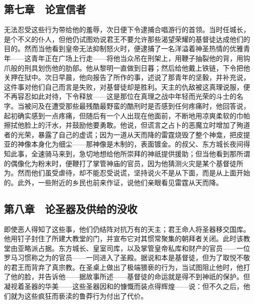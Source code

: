 
\subsection{第七章　论宣信者}

无法忍受这些行为带给他的羞辱，次日便下令逮捕合唱游行的首领。当时任城长，是个不义的仆人，但他仍试图劝说君王不要允许那些渴望荣耀的基督徒达成他们的目的。然而当他看到皇帝无法抑制怒火时，便逮捕了一名洋溢着神圣热情的优雅青年——这青年正在广场上行走——将他当众吊在刑架上，用鞭子抽裂他的背，用钩爪般的刑具划伤他的肋部。他从黎明一直做到日暮；然后给他戴上铁链，下令把他关押在狱中。次日早晨，他向报告了所作的事，述说了那青年的坚毅，并补充说，这件事对他们自己而言是失败，对基督徒却是胜利。天主的仇敌被这真理说服，便不再容忍如此对待，下令释放——这是那位在真理之战中年轻而光荣的斗士的名字。当被问及在遭受那些最残酷最野蛮的酷刑时是否感到任何疼痛时，他回答说，起初确实感到一点疼痛，但随后有一个人出现在他面前，不断地用凉爽柔软的巾帕擦拭他脸上的汗水，并鼓励他要勇敢。他说，但谎言之占卜的恶魔立时增加了殉道者的光荣，暴露了自己的虚谎；因为一道从天而降的雷霆烧毁了整个神龛，把皮提亚的神像本身化为细尘——那神像是木制的，表面镀金。的叔父、东方城长夜间得知此事，全速骑马来到，急切地想给他所崇拜的神祇提供援助；但当他看到那所谓的偶像化为粉末时，便鞭打了掌管神庙的官员，因为他猜测火灾是某个基督徒所为。然而他们虽受虐待，却不能忍受说谎，坚持说火不是从下面，而是从上面开始的。此外，一些附近的乡民也前来作证，说他们亲眼看见雷霆从天而降。\par


\subsection{第八章　论圣器及供给的没收}

即使恶人得知了这些事，他们仍结阵对抗万有的天主；君王命人将圣器移交国库。他用钉子封住了所建大教堂的门，并宣布它对其惯常聚集的朝拜者关闭。此时该教堂由亚略派占据。东方城长、皇室司库，以及掌管皇帝私库和财产的官员——一位罗马习惯称之为的官员——一同进入了圣殿。据说和本是基督徒，但为了取悦不敬的君王而背弃了真宗教。在圣桌上做出了极端猥亵的行为，当试图阻止他时，他打了他的脸，并告诉他——据故事所述——基督徒的命运就是得不到神祇的保护。但凝视着圣器的华美——这些圣器因和的慷慨而装点得辉煌——说：但不久之后，他们就为这些疯狂而亵渎的鲁莽行为付出了代价。\par

